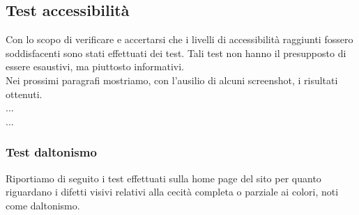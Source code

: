 \subsection{Test accessibilità}
Con lo scopo di verificare e accertarsi che i livelli di accessibilità raggiunti fossero soddisfacenti sono stati effettuati dei test. Tali test non hanno il presupposto di essere esaustivi, ma piuttosto informativi.\\
Nei prossimi paragrafi mostriamo, con l'ausilio di alcuni screenshot, i risultati ottenuti.\\
...\\
...
\subsubsection{Test daltonismo}
Riportiamo di seguito i test effettuati sulla home page del sito per quanto riguardano i difetti visivi relativi alla cecità completa o parziale ai colori, noti come daltonismo.
